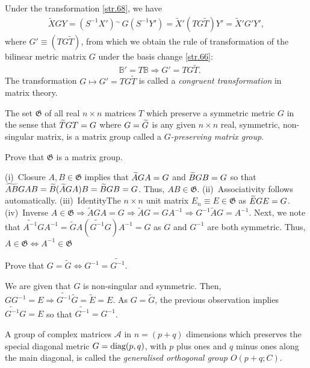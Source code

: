 \begin{small}
 Under the 
transformation \eqref{str.68}, we have 
\begin{align*}
\tilde{X}GY = (S^{-1}X'){}^{\sim} \,G(S^{-1}Y')
=\tilde{X}' (TG\tilde{T})Y'= \tilde{X}' G'Y' , 
\end{align*}
where $G'\equiv (TG\tilde{T})$, from which we obtain the 
rule of transformation of the bilinear metric matrix $G$ 
under the basis change \eqref{str.66}:
\begin{align}\label{str.71}
&\mathbb{B}'=T\mathbb{B}\Longrightarrow G' = TG\tilde{T}.
\end{align}
The transformation  $G\mapsto G' = TG\tilde{T}$ is called a
\textsl{congruent transformation} in matrix theory.

\dfn The set $\mathfrak{G}$ of all real $n \times n$ 
matrices $T $ which preserve a {symmetric metric} $G$ in the 
sense that $\widetilde{T}G T =G$ where $G=\widetilde{G}$ is {any given} $n 
\times n$ {real, symmetric,  non-singular matrix}, is a 
matrix group called a \textsl{$G$-preserving matrix group}.

\exm Prove that $\mathfrak{G}$ is a matrix group. 

\soln (i)~{Closure}  $A,B\in \mathfrak{G} $ implies that 
$\widetilde{A}G A =G $ and $\widetilde{B}G B =G $ so that $\widetilde{AB}G AB 
= \widetilde{B}(\widetilde{A}G A)B =\widetilde{B}G B=G  $. Thus, $AB\in 
\mathfrak{G} $. 
(ii)~{Associativity} follows automatically. 
(iii)~{Identity}The $n\times n $ unit matrix $E_n\equiv 
E\in\mathfrak{G} $ as $\widetilde{E}G E =G  $. 
(iv)~{Inverse}  
$A\in \mathfrak{G}\Rightarrow \tilde{A}G A =G \Rightarrow 
\tilde{A}G =GA^{-1}\Rightarrow G^{-1}\tilde{A}G =A^{-1}$. 
Next, we note that $\tilde{A^{-1}}G A^{-1}= \tilde{G}A 
(\tilde{G^{-1}}G) A^{-1} =G $ as $G  $ and $G^{-1} $ are 
both symmetric. Thus, $A\in \mathfrak{G}\Leftrightarrow 
A^{-1}\in \mathfrak{G}$

\exm Prove that $G=\tilde{G}\Leftrightarrow 
G^{-1}=\tilde{G^{-1}} $.

\soln We are given that $G$ is non-singular and 
symmetric. Then,  $GG^{-1}=E \Rightarrow 
\tilde{G^{-1}}\tilde{G}=\tilde{E}=E $. As  $G=\tilde{G}$, 
the previous observation implies $\tilde{G^{-1}}G=E $ so 
that $\tilde{G^{-1}}=G^{-1} $. \ebx

\dfn A group of complex matrices $\mathcal{A}$ in  
$n=(p+q)$ dimensions which preserves the special diagonal 
metric $G=\mbox{diag}(p,q)$, with $p$ {plus ones} and $q$ 
{minus ones} along the main diagonal, is called the 
\textsl{generalised orthogonal group $O(p+q;C)$}.


\end{small}
